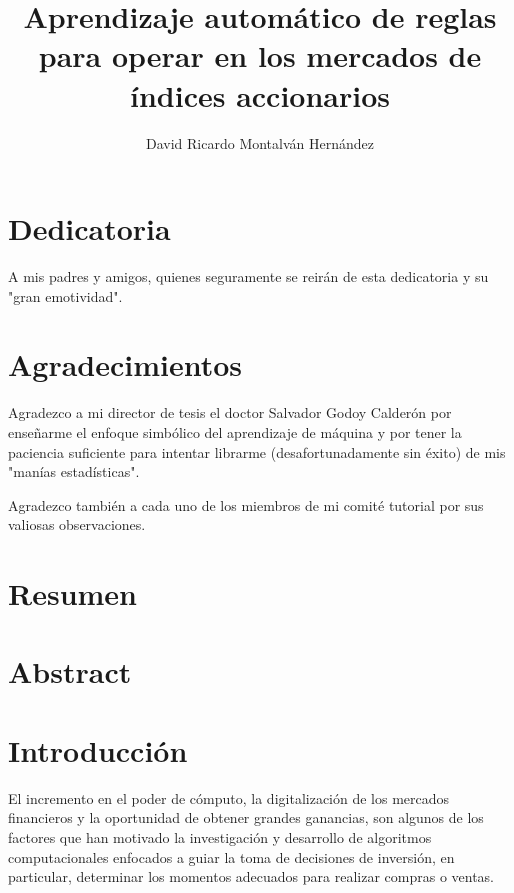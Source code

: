 \documentclass[12pt]{scrbook}
\title{Aprendizaje automático de reglas para operar en los mercados de índices accionarios}
\date{}
\author{David Ricardo Montalván Hernández}
\theoremstyle{break}
\theoremstyle{break}
\begin{document}
\maketitle
{} %
\renewcommand{\contentsname}{Contenido}
\tableofcontents
\renewcommand{\listfigurename}{Lista de imágenes}
\listoffigures
\renewcommand{\listtablename}{Lista de tablas}
\renewcommand\tablename{Tabla}
\renewcommand{\bibname}{Referencias}
\renewcommand{\figurename}{Imagen}
\listoftables

\chapter*{Dedicatoria}
A mis padres y amigos, quienes seguramente se reirán de esta dedicatoria y su "gran emotividad".

\chapter*{Agradecimientos}
Agradezco a mi director de tesis el doctor Salvador Godoy Calderón por enseñarme el enfoque simbólico del aprendizaje de máquina y por tener la paciencia suficiente para  intentar librarme (desafortunadamente sin éxito) de mis "manías estadísticas".

Agradezco también a cada uno de los miembros de mi comité tutorial por sus valiosas observaciones.

\chapter*{Resumen}
\chapter*{Abstract}


\chapter{Introducción}
\label{capitulo:introduccion}
El incremento en el poder de cómputo, la digitalización de los mercados financieros y la oportunidad de obtener grandes ganancias, son algunos de los factores que han motivado la investigación y desarrollo de algoritmos computacionales enfocados a guiar la toma de decisiones de inversión, en particular, determinar los momentos adecuados para realizar compras o ventas.
\end{document}
